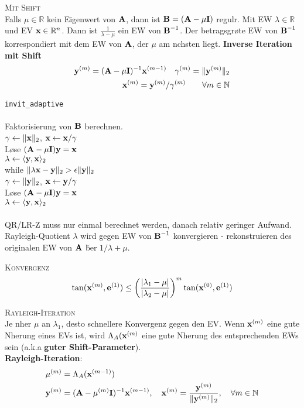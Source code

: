 \textsc{Mit Shift}\\
Falls $\mu \in \mathbb{R}$ kein Eigenwert von $\mbox{\bf A}$, dann ist $\mbox{\bf B}=(\mbox{\bf A}-\mu \mbox{\bf I})$ regul\a r. Mit EW $\lambda \in \mathbb{R}$ und EV $\mbox{\bf x} \in \mathbb{R}^{n}$. Dann ist $\frac{1}{\lambda-\mu}$ ein EW von $\mbox{\bf B}^{-1}$. Der betragsgr\o \s te EW von $\mbox{\bf B}^{-1}$ korrespondiert mit dem EW von $\mbox{\bf A}$, der $\mu$ am n\a chsten liegt.
\textbf{Inverse Iteration mit Shift}
\begin{align*}
\mbox{\bf y}^{(m)} = (\mbox{\bf A}-\mu \mbox{\bf I})^{-1}\mbox{\bf x}^{(m-1)} \quad \gamma^{(m)} = \Vert \mbox{\bf y}^{(m)} \Vert_2 \\ \mbox{\bf x}^{(m)} = \mbox{\bf y}^{(m)}/\gamma^{(m)}  \qquad \forall m\in \mathbb{N}
\end{align*}
\vspace{3cm}

\verb!invit_adaptive!\\
{\addtolength{\leftskip}{0mm}
\hrulefill\\
Faktorisierung von $\mbox{\bf B}$ berechnen. \\
$\gamma \leftarrow \Vert \mbox{\bf x} \Vert_2$, $\mbox{\bf x} \leftarrow \mbox{\bf x}/\gamma$ \\
L\o se $(\mbox{\bf A}-\mu \mbox{\bf I})\mbox{\bf y} = \mbox{\bf x}$\\
$\lambda \leftarrow \langle \mbox{\bf y},\mbox{\bf x} \rangle_2$\\
while $\Vert \lambda\mbox{\bf x} - \mbox{\bf y} \Vert_2 > \epsilon \Vert \mbox{\bf y} \Vert_2$ \\ 
\quad $\gamma \leftarrow \Vert \mbox{\bf y} \Vert_2$, $\mbox{\bf x} \leftarrow \mbox{\bf y}/\gamma$ \\
\quad L\o se $(\mbox{\bf A}-\mu \mbox{\bf I})\mbox{\bf y} = \mbox{\bf x}$\\
\quad $\lambda \leftarrow \langle \mbox{\bf y},\mbox{\bf x} \rangle_2$\\
\hrulefill\\
}
QR/LR-Z muss nur einmal berechnet werden, danach relativ geringer Aufwand.
Rayleigh-Quotient $\lambda$ wird gegen EW von $\mbox{\bf B}^{-1}$ konvergieren - rekonstruieren des originalen EW von $\mbox{\bf A}$ \u ber $1/\lambda +\mu$. \vspace{0.2cm}

\textsc{Konvergenz}
\begin{align*}
\tan(\mbox{\bf x}^{(m)}, \mbox{\bf e}^{(1)}) \leq \left( \frac{|\lambda_1 - \mu |}{|\lambda_2 - \mu|}\right)^m \tan (\mbox{\bf x}^{(0)}, \mbox{\bf e}^{(1)})
\end{align*} \vspace{0.2cm}

\textsc{Rayleigh-Iteration}\\
Je n\a her $\mu$ an $\lambda_1$, desto schnellere Konvergenz gegen den EV. Wenn $\mbox{\bf x}^{(m)}$ eine gute N\a herung eines EVs ist, wird $\Lambda_A(\mbox{\bf x}^{(m)}$ eine gute N\a herung des entsprechenden EWs sein (a.k.a \textbf{guter Shift-Parameter}).\\
\textbf{Rayleigh-Iteration}:
\begin{align*}
\mu^{(m)} &= \Lambda_A(\mbox{\bf x}^{(m-1)}) \\
\mbox{\bf y}^{(m)} &= (\mbox{\bf A} - \mu^{(m)}\mbox{\bf I})^{-1} \mbox{\bf x}^{(m-1)}, \quad \mbox{\bf x}^{(m)} = \frac{\mbox{\bf y}^{(m)}}{\Vert \mbox{\bf y}^{(m)} \Vert_2}, \quad \forall m\in \mathbb{N}
\end{align*}


